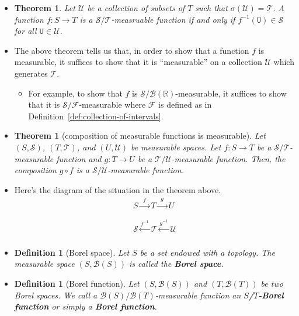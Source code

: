 \documentclass[10pt]{article}
\newtheorem{theorem}[lemma]{Theorem}
\newtheorem{definition}[lemma]{Definition}
\numberwithin{lemma}{section}
\newcommand{\mcal}[1]{\mathcal{#1}}
\newcommand{\Real}{\mathbb{R}}
\begin{document}
\begin{itemize}
  \item \begin{theorem}
    Let $\mcal{U}$ be a collection of subsets of $T$ such that $\sigma(\mcal{U}) = \mcal{T}$. A function $f: S \rightarrow T$ is a $\mcal{S}/\mcal{T}$-measruable function if and only if $f^{-1}(\mathtt{U}) \in \mcal{S}$ for all $\mathtt{U} \in \mcal{U}$.
  \end{theorem}

  \item The above theorem tells us that, in order to show that a function $f$ is measurable, it suffices to show that it is ``measurable'' on a collection $\mcal{U}$ which generates $\mcal{T}$.
  \begin{itemize}
    \item For example, to show that $f$ is $\mcal{S}/\mcal{B}(\Real)$-measurable, it suffices to show that it is $\mcal{S}/\mcal{F}$-measurable where $\mcal{F}$ is defined as in Definition~\ref{def:collection-of-intervals}.
  \end{itemize}

  \item \begin{theorem}[composition of measurable functions is measurable]
    Let $(S,\mcal{S})$, $(T,\mcal{T})$, and $(U, \mcal{U})$ be measurable spaces. Let $f: S \rightarrow T$ be a $\mcal{S}/\mcal{T}$-measurable function and $g: T \rightarrow U$ be a $\mcal{T}/\mcal{U}$-measurable function. Then, the composition $g \circ f$ is a $\mcal{S}/\mcal{U}$-measurable function. 
  \end{theorem}
  
  \item Here's the diagram of the situation in the theorem above.
  \begin{align*}
    S \xrightarrow[\phantom{f^{-1}}]{f} T \xrightarrow[\phantom{g^{-1}}]{g} U \\
    \mcal{S} \xleftarrow[]{f^{-1}} \mcal{T} \xleftarrow[]{g^{-1}} \mcal{U}
  \end{align*}

  \item \begin{definition}[Borel space]
    Let $S$ be a set endowed with a topology. The measurable space $(S,\mcal{B}(S))$ is called the {\bf Borel space}.
  \end{definition}

  \item \begin{definition}[Borel function]
    Let $(S, \mcal{B}(S))$ and $(T,\mcal{B}(T))$ be two Borel spaces. We call a $\mcal{B}(S)/\mcal{B}(T)$-measurable function an {\bf $S$/$T$-Borel function} or simply a {\bf Borel function}.
  \end{definition}


\end{itemize}
\end{document}

